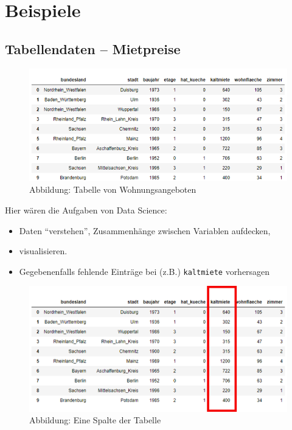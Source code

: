 \documentclass[]{book}
\providecommand{\tightlist}{%
  \setlength{\itemsep}{0pt}\setlength{\parskip}{0pt}}
\theoremstyle{definition}
\theoremstyle{definition}
\theoremstyle{definition}
\theoremstyle{definition}
\theoremstyle{remark}
\begin{document}
\hypertarget{beispiele}{%
\section{Beispiele}\label{beispiele}}

\hypertarget{tabellendaten-mietpreise}{%
\subsection{Tabellendaten -- Mietpreise}\label{tabellendaten-mietpreise}}

\begin{figure}
\centering
\includegraphics{bilder/dataframe.png}
\caption{Abbildung: Tabelle von Wohnungsangeboten}
\end{figure}

Hier wären die Aufgaben von Data Science:

\begin{itemize}
\tightlist
\item
  Daten ``verstehen'', Zusammenhänge zwischen
  Variablen aufdecken,
\item
  visualisieren.
\item
  Gegebenenfalls fehlende Einträge bei (z.B.) \texttt{kaltmiete} vorhersagen
\end{itemize}

\begin{figure}
\centering
\includegraphics{bilder/dataframe_spalte.png}
\caption{Abbildung: Eine Spalte der Tabelle}
\end{figure}
\end{document}
